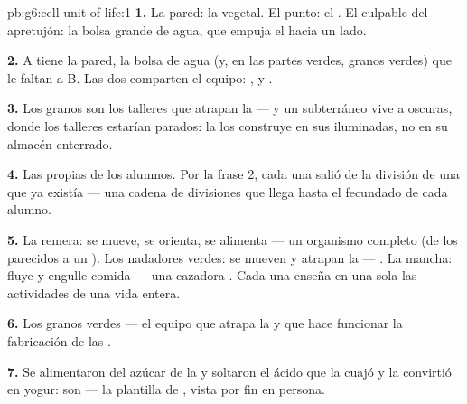 \begin{solution}{pb:g6:cell-unit-of-life:1}
\textbf{1.} La pared: la  vegetal. El punto: el . El
culpable del apretujón: la bolsa grande de agua, que empuja el 
hacia un lado.

\textbf{2.} A tiene la pared, la bolsa de agua (y, en las partes
verdes, granos verdes) que le faltan a B. Las dos comparten el equipo:
,  y .

\textbf{3.} Los granos son los talleres que atrapan la  --- y un
 subterráneo vive a oscuras, donde los talleres estarían parados:
la  los construye en sus  iluminadas, no en su almacén
enterrado.

\textbf{4.} Las propias  de los alumnos. Por la frase 2, cada
una salió de la división de una  que ya existía --- una cadena de
divisiones que llega hasta el  fecundado de cada alumno.

\textbf{5.} La remera: se mueve, se orienta, se alimenta --- un
organismo  completo (de los parecidos a un ). Los
nadadores verdes: se mueven y atrapan la  --- 
. La mancha: fluye y engulle comida --- una cazadora
. Cada una enseña en una sola  las actividades de una
vida entera.

\textbf{6.} Los granos verdes --- el equipo que atrapa la  y que
hace funcionar la fabricación de las .

\textbf{7.} Se alimentaron del azúcar de la  y soltaron el ácido
que la cuajó y la convirtió en yogur: son   ---
la plantilla de , vista por fin en persona.


\end{solution}
